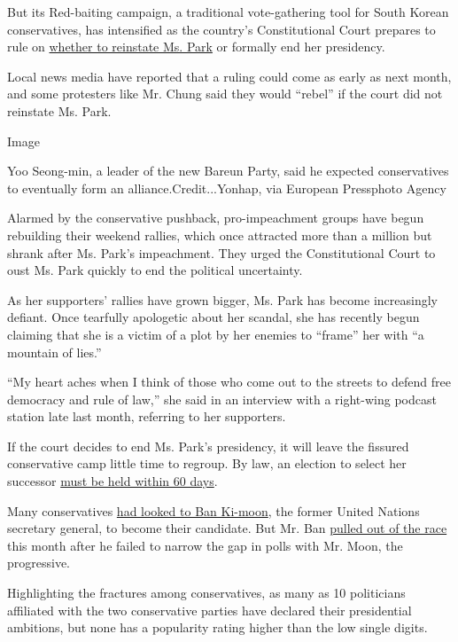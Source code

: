 But its Red-baiting campaign, a traditional vote-gathering tool for
South Korean conservatives, has intensified as the country's
Constitutional Court prepares to rule on
\href{https://www.nytimes.com/2017/01/03/world/asia/south-korea-president-impeachment-trial.html}{whether
to reinstate Ms. Park} or formally end her presidency.

Local news media have reported that a ruling could come as early as next
month, and some protesters like Mr. Chung said they would ``rebel'' if
the court did not reinstate Ms. Park.

Image

Yoo Seong-min, a leader of the new Bareun Party, said he expected
conservatives to eventually form an alliance.Credit...Yonhap, via
European Pressphoto Agency

Alarmed by the conservative pushback, pro-impeachment groups have begun
rebuilding their weekend rallies, which once attracted more than a
million but shrank after Ms. Park's impeachment. They urged the
Constitutional Court to oust Ms. Park quickly to end the political
uncertainty.

As her supporters' rallies have grown bigger, Ms. Park has become
increasingly defiant. Once tearfully apologetic about her scandal, she
has recently begun claiming that she is a victim of a plot by her
enemies to ``frame'' her with ``a mountain of lies.''

``My heart aches when I think of those who come out to the streets to
defend free democracy and rule of law,'' she said in an interview with a
right-wing podcast station late last month, referring to her supporters.

If the court decides to end Ms. Park's presidency, it will leave the
fissured conservative camp little time to regroup. By law, an election
to select her successor
\href{https://www.nytimes.com/2016/11/27/world/asia/impeaching-south-korea-president.html?_r=0}{must
be held within 60 days}.

Many conservatives
\href{https://www.nytimes.com/2017/01/25/world/asia/ban-ki-moon-south-korea-president.html}{had
looked to Ban Ki-moon}, the former United Nations secretary general, to
become their candidate. But Mr. Ban
\href{https://www.nytimes.com/2017/02/01/world/asia/ban-ki-moon-president-south-korea.html}{pulled
out of the race} this month after he failed to narrow the gap in polls
with Mr. Moon, the progressive.

Highlighting the fractures among conservatives, as many as 10
politicians affiliated with the two conservative parties have declared
their presidential ambitions, but none has a popularity rating higher
than the low single digits.

